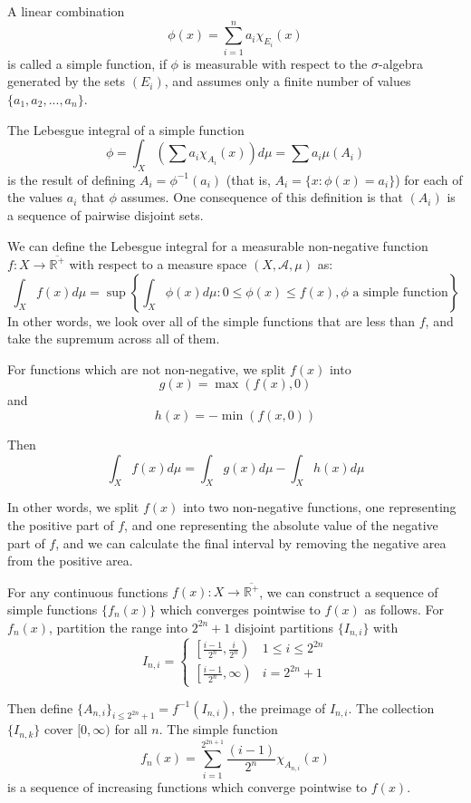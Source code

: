 \documentclass{article}
\begin{document}
A linear combination
\[ \phi(x) = \sum_{i=1}^{n}a_i\chi_{E_i}(x) \]
is called a simple function, if $\phi$ is measurable with respect to the $\sigma$-algebra
generated by the sets $(E_i)$, and assumes only a finite number of values
$\{a_1,a_2,...,a_n\}$. 

The Lebesgue integral of a simple function
\[\phi = \int_X \left( \sum a_i \chi_{A_i}(x)\right) d\mu = \sum a_i \mu(A_i) \]
is the result of defining $A_i = \phi^{-1}(a_i)$ (that is,
$A_i = \{x:\phi(x)=a_i\}$) for each of the values $a_i$ that $\phi$ assumes. One consequence
of this definition is that $\left(A_i\right)$ is a sequence of pairwise disjoint sets.

We can define the Lebesgue integral for a measurable non-negative function $f:X \rightarrow 
\overline{\mathbb{R}^{+}}$ with respect to a measure space $(X, \mathcal{A},\mu)$ as:
\[ \int_X f(x) d\mu = \sup\left\{\int_X \phi(x) d\mu: 0 \le \phi(x) \le f(x), \phi \textrm{ a
simple function} \right\} \]
In other words, we look over all of the simple functions that are less than $f$, and take
the supremum across all of them.

For functions which are not non-negative, we split $f(x)$ into
\[ g(x) = \max(f(x),0) \]
and
\[ h(x) = - \min(f(x,0)) \]

Then 
\[\int_X f(x) d\mu = \int_X g(x) d\mu - \int_X h(x) d\mu \]

In other words, we split $f(x)$ into two non-negative functions, one representing the positive
part of $f$, and one representing the absolute value of the negative part of $f$, and we can
calculate the final interval by removing the negative area from the positive area.

For any continuous functions $f(x): X \rightarrow \overline{\mathbb{R}^{+}}$, we can construct
a sequence of simple functions $\{f_n(x)\}$ which converges pointwise to $f(x)$ as follows.
For $f_n(x)$, partition the range into $2^{2n}+1$ disjoint partitions $\{I_{n,i}\}$ with 
\[ I_{n,i}  = \left\{ 
\begin{array}{ll}
	\left[\frac{i-1}{2^n},\frac{i}{2^n}\right) & 1 \le i \le 2^{2n} \\[3pt]
	\left[\frac{i-1}{2^n},\infty\right) & i=2^{2n} + 1 
\end{array} \right. \]

Then define $\{A_{n,i}\}_{i \le 2^{2n} + 1} = f^{-1}(I_{n,i})$, the preimage of $I_{n,i}$.
The collection $\{I_{n,k}\}$ cover $[0,\infty)$ for all $n$. The simple function 
\[ f_n(x) = \sum_{i=1}^{2^{2n+1}}\frac{(i-1)}{2^n}\chi_{A_{n,i}}(x) \]
is a sequence of increasing functions which converge pointwise to $f(x)$.
\end{document}
